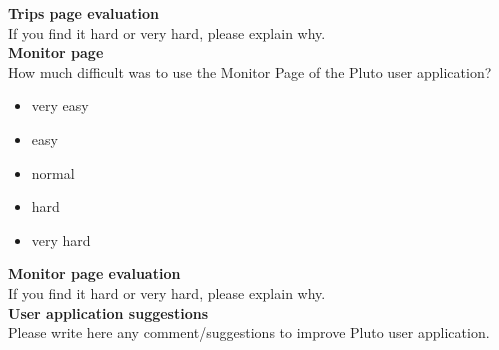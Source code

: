 \textbf{Trips page evaluation}
\\

If you find it hard or very hard, please explain why.
\\ 

\textbf{Monitor page}
\\

How much difficult was to use the Monitor Page of the Pluto user application?


\begin{itemize}
\item{very easy}
\item{easy}
\item{normal}
\item{hard}
\item{very hard}

\end{itemize}

\textbf{Monitor page evaluation}
\\

If you find it hard or very hard, please explain why.
\\ 

\textbf{User application suggestions}
\\

Please write here any comment/suggestions to improve Pluto user application.
\\ 

